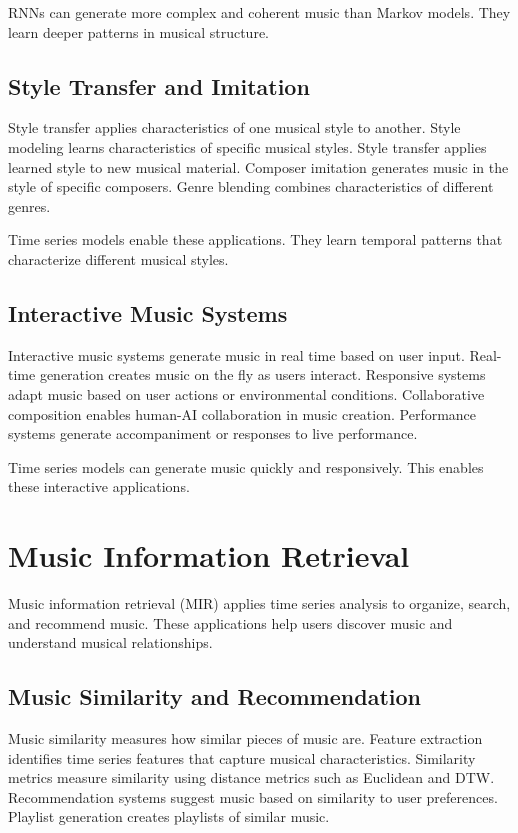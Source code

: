 RNNs can generate more complex and coherent music than Markov models. They learn deeper patterns in musical structure.

\subsection{Style Transfer and Imitation}

Style transfer applies characteristics of one musical style to another. Style modeling learns characteristics of specific musical styles. Style transfer applies learned style to new musical material. Composer imitation generates music in the style of specific composers. Genre blending combines characteristics of different genres.

Time series models enable these applications. They learn temporal patterns that characterize different musical styles.

\subsection{Interactive Music Systems}

Interactive music systems generate music in real time based on user input. Real-time generation creates music on the fly as users interact. Responsive systems adapt music based on user actions or environmental conditions. Collaborative composition enables human-AI collaboration in music creation. Performance systems generate accompaniment or responses to live performance.

Time series models can generate music quickly and responsively. This enables these interactive applications.

\section{Music Information Retrieval}

Music information retrieval (MIR) applies time series analysis to organize, search, and recommend music. These applications help users discover music and understand musical relationships.

\subsection{Music Similarity and Recommendation}

Music similarity measures how similar pieces of music are. Feature extraction identifies time series features that capture musical characteristics. Similarity metrics measure similarity using distance metrics such as Euclidean and DTW. Recommendation systems suggest music based on similarity to user preferences. Playlist generation creates playlists of similar music.

